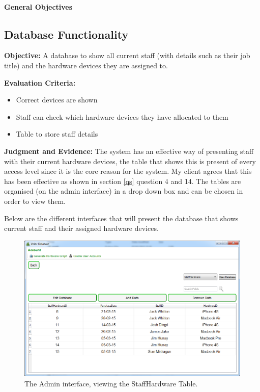 \paragraph{General Objectives}

\subsection{Database Functionality}\label{staffhardware}

\textbf{Objective:} A database to show all current staff (with details such as their job title) and the hardware devices they are assigned to.

\textbf{Evaluation Criteria:}
\begin{itemize}
\item{Correct devices are shown}
\item{Staff can check which hardware devices they have allocated to them}
\item{Table to store staff details}
\end{itemize}

\textbf{Judgment and Evidence:}
The system has an effective way of presenting staff with their current hardware devices, the table that shows this is present of every access level since it is the core reason for the system. My client agrees that this has been effective as shown in section \ref{qs} question 4 and 14. The tables are organised (on the admin interface) in a drop down box and can be chosen in order to view them.

Below are the different interfaces that will present the database that shows current staff and their assigned hardware devices.

\begin{figure}[H]
    \includegraphics[width=\textwidth]{./Evaluation/Images/Database1.png}
    \caption{The Admin interface, viewing the StaffHardware Table.} \label{fig:db1}
\end{figure}


